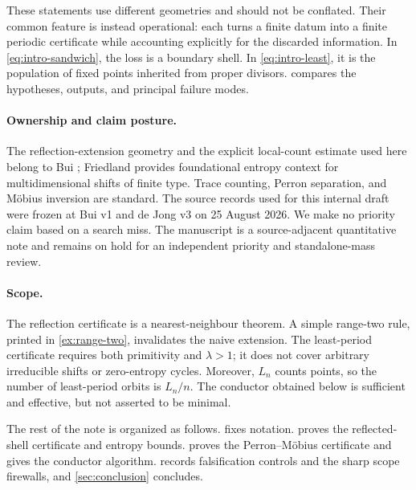 These statements use different geometries and should not be conflated.
Their common feature is instead operational: each turns a finite datum into a
finite periodic certificate while accounting explicitly for the discarded
information.  In \cref{eq:intro-sandwich}, the loss is a boundary shell.  In
\cref{eq:intro-least}, it is the population of fixed points inherited from
proper divisors.   compares the hypotheses, outputs,
and principal failure modes.



\paragraph{Ownership and claim posture.}
The reflection-extension geometry and the explicit local-count estimate used
here belong to Bui \cite{Bui2026}; Friedland \cite{Friedland1997} provides
foundational entropy context for multidimensional shifts of finite type.
Trace counting, Perron separation, and M\"obius inversion are standard.  The
source records used for this internal draft were frozen at Bui v1 and de Jong
v3 on 25 August 2026.  We make no priority claim based on a search miss.  The
manuscript is a source-adjacent quantitative note and remains on hold for an
independent priority and standalone-mass review.

\paragraph{Scope.}
The reflection certificate is a nearest-neighbour theorem.  A simple
range-two rule, printed in \cref{ex:range-two}, invalidates the naive
extension.  The least-period certificate requires both primitivity and
$\lambda>1$; it does not cover arbitrary irreducible shifts or zero-entropy
cycles.  Moreover, $L_n$ counts points, so the number of least-period orbits
is $L_n/n$.  The conductor obtained below is sufficient and effective, but
not asserted to be minimal.

The rest of the note is organized as follows.  
fixes notation.   proves the reflected-shell
certificate and entropy bounds.   proves the
Perron--M\"obius certificate and gives the conductor algorithm.
 records falsification controls and the sharp scope
firewalls, and \cref{sec:conclusion} concludes.
